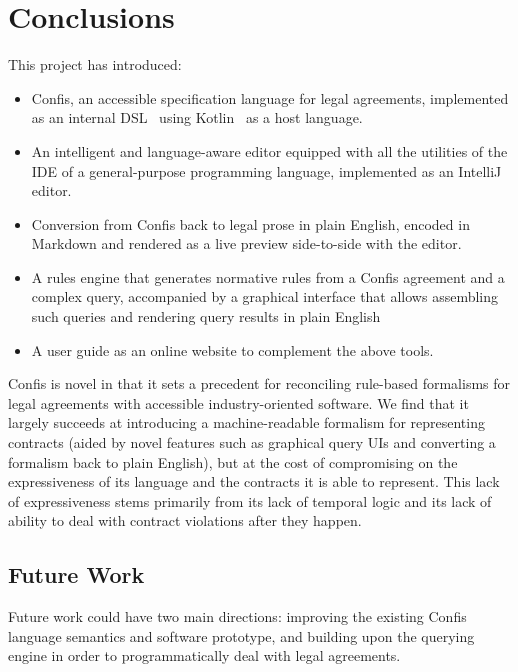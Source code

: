 \chapter{Conclusions}\label{ch:conclusions}

This project has introduced:
\begin{itemize}
    \item Confis, an accessible specification language for legal agreements, implemented as an internal DSL~\cite{fowlerDsl} using Kotlin~\cite{kotlinLang} as a host language.
    \item An intelligent and language-aware editor equipped with all the utilities of the IDE of a general-purpose programming language, implemented as an IntelliJ~\cite{intelliJRepo} editor.
    \item Conversion from Confis back to legal prose in plain English, encoded in Markdown and rendered as a live preview side-to-side with the editor.
    \item A rules engine that generates normative rules from a Confis agreement and a complex query, accompanied by a graphical interface that allows assembling such queries and rendering query results in plain English
    \item A user guide as an online website to complement the above tools.
\end{itemize}


Confis is novel in that it sets a precedent for reconciling rule-based formalisms for legal agreements with accessible industry-oriented software.
We find that it largely succeeds at introducing a machine-readable formalism for representing contracts (aided by novel features such as graphical query UIs and converting a formalism back to plain English), but at the cost of compromising on the expressiveness of its language and the contracts it is able to represent.
This lack of expressiveness stems primarily from its lack of temporal logic and its lack of ability to deal with contract violations after they happen.


\section{Future Work}\label{sec:future-work}

Future work could have two main directions: improving the existing Confis language semantics and software prototype, and building upon the querying engine in order to programmatically deal with legal agreements.

